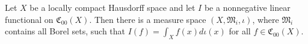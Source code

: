 Let $X$ be a locally compact Hausdorff space and let $I$ be a nonnegative linear functional on $\mathfrak{C}_{00}(X)$. Then there is a measure space $(X, \mathfrak{M}_i, \iota)$, where $\mathfrak{M}_i$ contains all Borel sets, such that $I(f) = \int_X f(x) d\iota(x)$ for all $f \in \mathfrak{C}_{00}(X)$.
